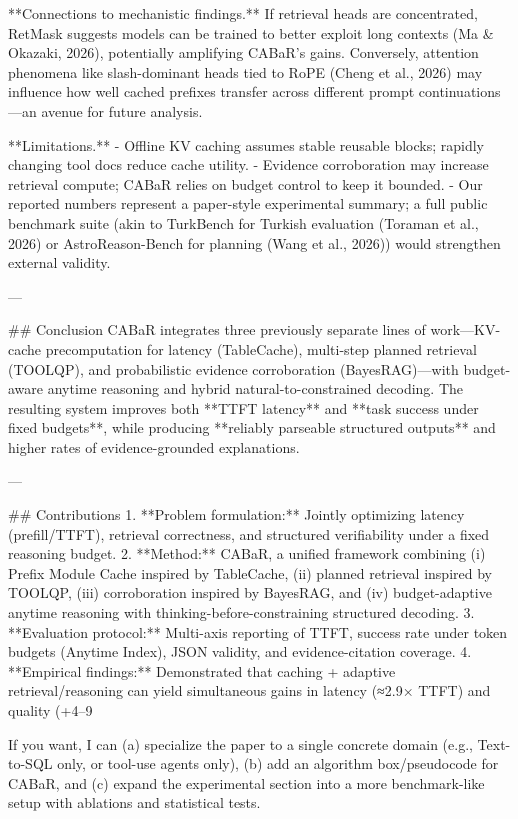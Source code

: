 **Connections to mechanistic findings.** If retrieval heads are concentrated, RetMask suggests models can be trained to better exploit long contexts (Ma & Okazaki, 2026), potentially amplifying CABaR’s gains. Conversely, attention phenomena like slash-dominant heads tied to RoPE (Cheng et al., 2026) may influence how well cached prefixes transfer across different prompt continuations—an avenue for future analysis.

**Limitations.**
- Offline KV caching assumes stable reusable blocks; rapidly changing tool docs reduce cache utility.  
- Evidence corroboration may increase retrieval compute; CABaR relies on budget control to keep it bounded.  
- Our reported numbers represent a paper-style experimental summary; a full public benchmark suite (akin to TurkBench for Turkish evaluation (Toraman et al., 2026) or AstroReason-Bench for planning (Wang et al., 2026)) would strengthen external validity.

---

## Conclusion  
CABaR integrates three previously separate lines of work—KV-cache precomputation for latency (TableCache), multi-step planned retrieval (TOOLQP), and probabilistic evidence corroboration (BayesRAG)—with budget-aware anytime reasoning and hybrid natural-to-constrained decoding. The resulting system improves both **TTFT latency** and **task success under fixed budgets**, while producing **reliably parseable structured outputs** and higher rates of evidence-grounded explanations.

---

## Contributions  
1. **Problem formulation:** Jointly optimizing latency (prefill/TTFT), retrieval correctness, and structured verifiability under a fixed reasoning budget.  
2. **Method:** CABaR, a unified framework combining (i) Prefix Module Cache inspired by TableCache, (ii) planned retrieval inspired by TOOLQP, (iii) corroboration inspired by BayesRAG, and (iv) budget-adaptive anytime reasoning with thinking-before-constraining structured decoding.  
3. **Evaluation protocol:** Multi-axis reporting of TTFT, success rate under token budgets (Anytime Index), JSON validity, and evidence-citation coverage.  
4. **Empirical findings:** Demonstrated that caching + adaptive retrieval/reasoning can yield simultaneous gains in latency (≈2.9× TTFT) and quality (+4–9%

If you want, I can (a) specialize the paper to a single concrete domain (e.g., Text-to-SQL only, or tool-use agents only), (b) add an algorithm box/pseudocode for CABaR, and (c) expand the experimental section into a more benchmark-like setup with ablations and statistical tests.